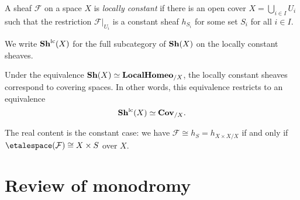 \begin{defn}
A sheaf $\mathcal F$ on a space $X$ is \emph{locally constant} if there is an open cover $X = \bigcup_{i\in I}U_i$ such that the restriction $\mathcal F|_{U_i}$ is a constant sheaf $h_{S_i}$ for some set $S_i$ for all $i\in I$.

We write $\operatorname{\mathbf{Sh}^{\smash{\textup{lc}}}}(X)$ for the full subcategory of $\operatorname{\mathbf{Sh}}(X)$ on the locally constant sheaves.
\end{defn}

\begin{lem}
Under the equivalence $\operatorname{\mathbf{Sh}}(X)\simeq\mathbf{LocalHomeo}_{/X}$, the locally constant sheaves correspond to covering spaces.
In other words, this equivalence restricts to an equivalence
\[ \operatorname{\mathbf{Sh}^{\smash{\textup{lc}}}}(X) \simeq \mathbf{Cov}_{/X}\text{.} \]
\end{lem}

The real content is the constant case: we have $\mathcal F\cong h_S = h_{X\times X/X}$ if and only if $\etalespace(\mathcal F)\cong X\times S$ over $X$.


\section{Review of monodromy}

